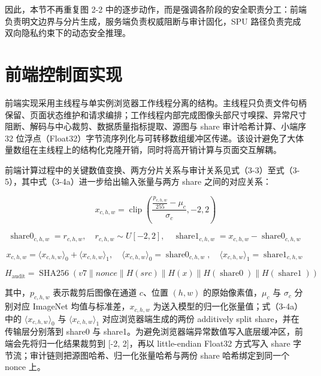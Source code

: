 因此，本节不再重复图 2-2 中的逐步动作，而是强调各阶段的安全职责分工：前端负责明文边界与分片生成，服务端负责权威阻断与审计固化，SPU 路径负责完成双向隐私约束下的动态安全推理。

\section{前端控制面实现}

前端实现采用主线程与单实例浏览器工作线程分离的结构。主线程只负责文件句柄保留、页面状态维护和请求编排；工作线程内部完成图像头部尺寸嗅探、异常尺寸阻断、解码与中心裁剪、数据质量指标提取、源图与 share 审计哈希计算、小端序 32 位浮点（Float32）字节流序列化与可转移数组缓冲区传递。该设计避免了大体量数组在主线程上的结构化克隆开销，同时将高开销计算与页面交互解耦。

前端计算过程中的关键数值变换、两方分片关系与审计关系见式（3-3）至式（3-5），其中式（3-4a）进一步给出输入张量与两方 share 之间的对应关系：

\begin{equation}
x_{c,h,w}=\operatorname{clip}\!\left(\frac{\frac{p_{c,h,w}}{255}-\mu_c}{\sigma_c},-2,2\right)
\tag{3-3}
\end{equation}

\begin{equation}
\operatorname{share0}_{c,h,w}=r_{c,h,w}, \quad r_{c,h,w}\sim U[-2,2], \quad \operatorname{share1}_{c,h,w}=x_{c,h,w}-\operatorname{share0}_{c,h,w}
\tag{3-4}
\end{equation}

\begin{equation}
x_{c,h,w}=\langle x_{c,h,w}\rangle_{0}+\langle x_{c,h,w}\rangle_{1}, \quad \langle x_{c,h,w}\rangle_{0}=\operatorname{share0}_{c,h,w}, \quad \langle x_{c,h,w}\rangle_{1}=\operatorname{share1}_{c,h,w}
\tag{3-4a}
\end{equation}

\begin{equation}
H_{\text{audit}}=\operatorname{SHA256}\!\left(v7 \parallel nonce \parallel H(src) \parallel H(x) \parallel H(\operatorname{share0}) \parallel H(\operatorname{share1})\right)
\tag{3-5}
\end{equation}

其中，$p_{c,h,w}$ 表示裁剪后图像在通道 $c$、位置 $(h,w)$ 的原始像素值，$\mu_c$ 与 $\sigma_c$ 分别对应 ImageNet 均值与标准差，$x_{c,h,w}$ 为送入模型的归一化张量值；式（3-4a）中的 $\langle x_{c,h,w}\rangle_0$ 与 $\langle x_{c,h,w}\rangle_1$ 对应浏览器端生成的两份 additively split share，并在传输层分别落到 share0 与 share1。为避免浏览器端异常数值写入底层缓冲区，前端会先将归一化结果裁剪到 [-2, 2]，再以 little-endian Float32 方式写入 share 字节流；审计链则把源图哈希、归一化张量哈希与两份 share 哈希绑定到同一个 nonce 上。

